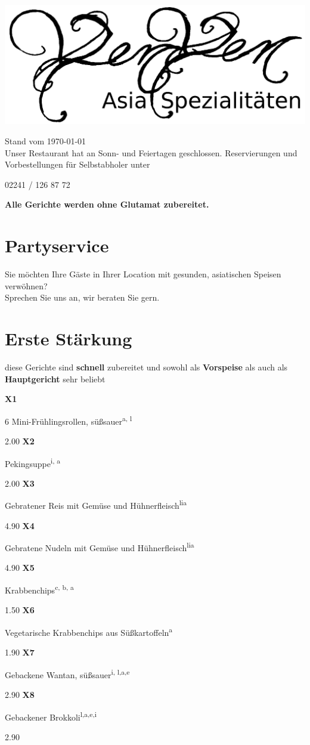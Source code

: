 \documentclass[a4paper,10pt,notumble]{leaflet}
\newcommand{\meal}[4]{\textbf{#1}\hspace{3mm}%
\begin{minipage}[t]{5.5 cm}
\begin{flushleft}
#2\textsuperscript{#3}
\end{flushleft}
\end{minipage}%
\hfill\SI{#4}{\EUR}\newline}
\newcommand{\Getreideprodukte}{a}
\newcommand{\Fisch}{b}
\newcommand{\Krebstiere}{c}
\newcommand{\Sellerie}{e}
\newcommand{\Eier}{i}
\newcommand{\Soja}{l}
\begin{document}
 

\begin{center}
\includegraphics[width=\textwidth]{gfx/yenyen_head_bw_text.png}
\end{center}

{\small Stand vom \today}\\[5mm]
Unser Restaurant hat an Sonn- und Feiertagen geschlossen. Reservierungen und Vorbestellungen für Selbstabholer unter
\begin{center}
{\Huge 02241 / 126 87 72}
\end{center}

\textbf{Alle Gerichte werden ohne Glutamat zubereitet.}

\section*{Partyservice}
Sie möchten Ihre Gäste in Ihrer Location mit gesunden, asiatischen Speisen verwöhnen?\\ 
Sprechen Sie uns an, wir beraten Sie gern.

\section*{Erste Stärkung}
diese Gerichte sind \textbf{schnell} zubereitet und sowohl als
\textbf{Vorspeise} als auch als \textbf{Hauptgericht} sehr beliebt
\begin{flushleft}
\meal{X1}{6 Mini-Frühlingsrollen, süßsauer}{\Getreideprodukte, \Soja}{2.00}
\meal{X2}{Pekingsuppe}{\Eier, \Getreideprodukte}{2.00}
\meal{X3}{Gebratener Reis mit Gemüse und Hühnerfleisch}{\Soja \Eier \Getreideprodukte}{4.90}
\meal{X4}{Gebratene Nudeln mit Gemüse und Hühnerfleisch}{\Soja \Eier \Getreideprodukte}{4.90}
\meal{X5}{Krabbenchips}{\Krebstiere, \Fisch, \Getreideprodukte}{1.50}
\meal{X6}{Vegetarische Krabbenchips aus Süßkartoffeln}{\Getreideprodukte}{1.90}
\meal{X7}{Gebackene Wantan, süßsauer}{\Eier, \Soja,\Getreideprodukte,\Sellerie}{2.90}
\meal{X8}{Gebackener Brokkoli}{\Soja,\Getreideprodukte,\Sellerie,\Eier}{2.90}
\end{flushleft}
\end{document}
